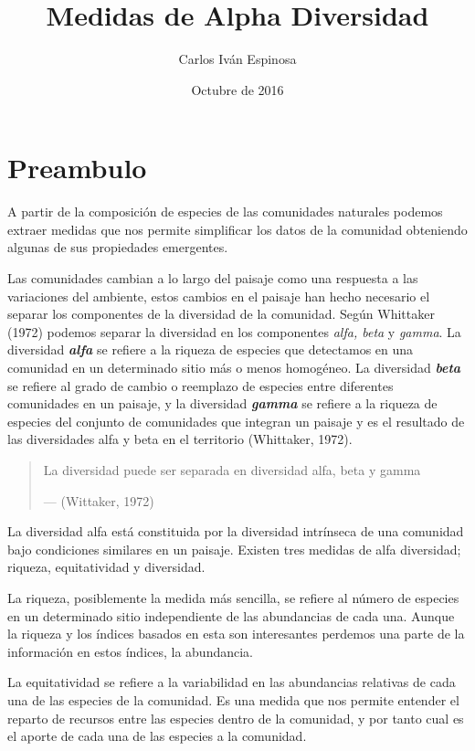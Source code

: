 \documentclass[]{book}
\title{Medidas de Alpha Diversidad}
\author{Carlos Iván Espinosa}
\date{Octubre de 2016}
\begin{document}
\maketitle

{
\setcounter{tocdepth}{1}
\tableofcontents
}
\chapter*{Preambulo}\label{preambulo}

A partir de la composición de especies de las comunidades naturales
podemos extraer medidas que nos permite simplificar los datos de la
comunidad obteniendo algunas de sus propiedades emergentes.

Las comunidades cambian a lo largo del paisaje como una respuesta a las
variaciones del ambiente, estos cambios en el paisaje han hecho
necesario el separar los componentes de la diversidad de la comunidad.
Según Whittaker (1972) podemos separar la diversidad en los componentes
\emph{alfa, beta} y \emph{gamma}. La diversidad \emph{\textbf{alfa}} se
refiere a la riqueza de especies que detectamos en una comunidad en un
determinado sitio más o menos homogéneo. La diversidad
\emph{\textbf{beta}} se refiere al grado de cambio o reemplazo de
especies entre diferentes comunidades en un paisaje, y la diversidad
\emph{\textbf{gamma}} se refiere a la riqueza de especies del conjunto
de comunidades que integran un paisaje y es el resultado de las
diversidades alfa y beta en el territorio (Whittaker, 1972).

\begin{quote}
La diversidad puede ser separada en diversidad alfa, beta y gamma

--- (Wittaker, 1972)
\end{quote}

La diversidad alfa está constituida por la diversidad intrínseca de una
comunidad bajo condiciones similares en un paisaje. Existen tres medidas
de alfa diversidad; riqueza, equitatividad y diversidad.

La riqueza, posiblemente la medida más sencilla, se refiere al número de
especies en un determinado sitio independiente de las abundancias de
cada una. Aunque la riqueza y los índices basados en esta son
interesantes perdemos una parte de la información en estos índices, la
abundancia.

La equitatividad se refiere a la variabilidad en las abundancias
relativas de cada una de las especies de la comunidad. Es una medida que
nos permite entender el reparto de recursos entre las especies dentro de
la comunidad, y por tanto cual es el aporte de cada una de las especies
a la comunidad.
\end{document}
